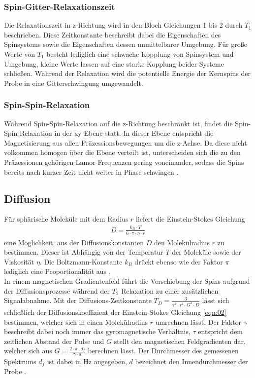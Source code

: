\subsubsection{Spin-Gitter-Relaxationszeit}
Die Relaxationszeit in z-Richtung wird in den Bloch Gleichungen 1 bis 2
durch $T_1$ beschrieben. Diese Zeitkonstante beschreibt dabei die Eigenschaften
des Spinsystems sowie die Eigenschaften dessen unmittelbarer Umgebung. Für große
Werte von $T_1$ besteht lediglich eine schwache Kopplung von Spinsystem und
Umgebung, kleine Werte lassen auf eine starke Kopplung beider Systeme schließen.
Während der Relaxation wird die potentielle Energie der Kernspins der Probe in
eine Gitterschwingung umgewandelt. \\
\subsubsection{Spin-Spin-Relaxation}
\noindent Während Spin-Spin-Relaxation auf die z-Richtung beschränkt ist, findet
die Spin-Spin-Relaxation in der xy-Ebene statt. In dieser Ebene entspricht die
Magnetisierung aus allen Präzessionsbewegungen um die z-Achse. Da diese nicht
volkommen homogen über die Ebene verteilt ist, unterscheiden sich die zu den
Präzessionen gehörigen Lamor-Frequenzen gering voneinander, sodass die
Spins bereits nach kurzer Zeit nicht weiter in Phase schwingen \cite{nmr}.
\subsection{Diffusion}
\noindent Für sphärische Moleküle mit dem Radius $r$ liefert die
Einstein-Stokes Gleichung
\begin{align}
  D = \frac{k_B \cdot T}{6 \cdot \pi \cdot \eta \cdot r}
  \label{eqn:02}
\end{align}
\noindent eine Möglichkeit, aus der Diffusionskonstanten $D$ den Molekülradius
$r$ zu bestimmen. Dieser ist Abhängig von der Temperatur $T$ der Moleküle sowie
der Viskosität $\eta$. Die Boltzmann-Konstante $k_B$ drückt ebenso wie der
Faktor $\pi$ lediglich eine Proportionalität aus \cite{stokes}. \\
\noindent In einem magnetischen Gradientenfeld führt die Verschiebung der Spins
aufgrund der Diffusionsprozesse während der $T_2$ Relaxation zu einer
zusätzlichen Signalabnahme. Mit der Diffusions-Zeitkonstante
$T_D = \frac{3}{\gamma^2 \cdot \tau^2 \cdot G^2 \cdot D}$ lässt sich schließlich
der Diffusionskoeffizient der Einstein-Stokes Gleichung \ref{eqn:02} bestimmen,
welcher sich in einen Molekülradius $r$ umrechnen lässt. Der Faktor $\gamma$
beschreibt dabei noch immer das gyromagnetische Verhältnis, $\tau$ entspricht
dem zeitlichen Abstand der Pulse und $G$ stellt den magnetischen Feldgradienten
dar, welcher sich aus $G = \frac{2 \cdot \pi \cdot d_f}{\gamma \cdot d}$
berechnen lässt. Der Durchmesser des gemessenen Spektrums $d_f$ ist dabei in
$\si{\hertz}$ angegeben, $d$ bezeichnet den Innendurchmesser der Probe \cite{sample}.
